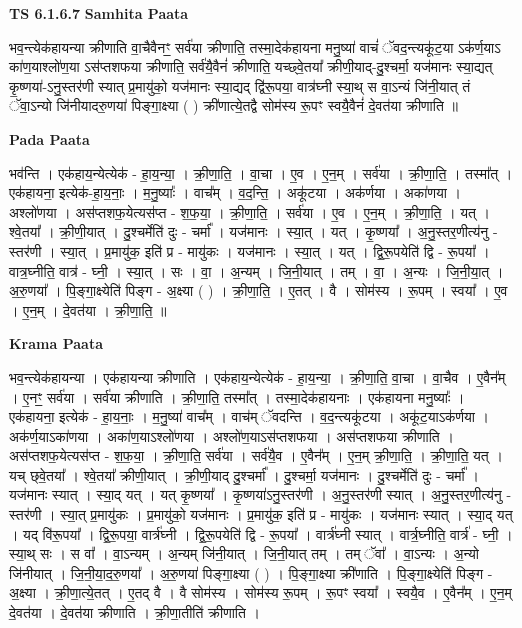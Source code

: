 \documentclass[17pt]{extarticle}
\begin{document}
\textbf{TS 6.1.6.7 } \newline
\textbf{Samhita Paata} \newline

भव॒न्त्येक॑हायन्या क्रीणाति वा॒चैवैनꣳ॒॒ सर्व॑या क्रीणाति॒ तस्मा॒देक॑हायना मनु॒ष्या॑ वाचं॑ ॅवद॒न्त्यकू॑ट॒या ऽक॑र्ण॒याऽ का॑ण॒याश्लो॑ण॒या ऽस॑प्तशफया क्रीणाति॒ सर्व॑यै॒वैनं॑ क्रीणाति॒ यच्छ्वे॒तया᳚ क्रीणी॒याद्-दु॒श्चर्मा॒ यज॑मानः स्या॒द्यत् कृ॒ष्णया॑-ऽनु॒स्तर॑णी स्यात् प्र॒मायु॑को॒ यज॑मानः स्या॒द्यद् द्वि॑रू॒पया॒ वात्र॑घ्नी स्या॒थ् स वा॒ऽन्यं जि॑नी॒यात् तं ॅवा॒ऽन्यो जि॑नीयादरु॒णया॑ पिङ्गा॒क्ष्या ( ) क्री॑णात्ये॒तद्वै सोम॑स्य रू॒पꣳ स्वयै॒वैनं॑ दे॒वत॑या क्रीणाति ॥ \newline

\textbf{Pada Paata} \newline

भव॑न्ति । एक॑हाय॒न्येत्येक॑ - हा॒य॒न्या॒ । क्री॒णा॒ति॒ । वा॒चा । ए॒व । ए॒न॒म् । सर्व॑या । क्री॒णा॒ति॒ । तस्मा᳚त् । एक॑हायना॒ इत्येक॑-हा॒य॒नाः॒ । म॒नु॒ष्याः᳚ । वाच᳚म् । व॒द॒न्ति॒ । अकू॑टया । अक॑र्णया । अका॑णया । अश्लो॑णया । अस॑प्तशफ॒येत्यस॑प्त - श॒फ॒या॒ । क्री॒णा॒ति॒ । सर्व॑या । ए॒व । ए॒न॒म् । क्री॒णा॒ति॒ । यत् । श्वे॒तया᳚ । क्री॒णी॒यात् । दु॒श्चर्मेति॑ दुः - चर्मा᳚ । यज॑मानः । स्या॒त् । यत् । कृ॒ष्णया᳚ । अ॒नु॒स्तर॒णीत्य॑नु - स्तर॑णी । स्या॒त् । प्र॒मायु॑क॒ इति॑ प्र - मायु॑कः । यज॑मानः । स्या॒त् । यत् । द्वि॒रू॒पयेति॑ द्वि - रू॒पया᳚ । वात्र॒घ्नीति॒ वात्र॑ - घ्नी॒ । स्या॒त् । सः । वा॒ । अ॒न्यम् । जि॒नी॒यात् । तम् । वा॒ । अ॒न्यः । जि॒नी॒या॒त् । अ॒रु॒णया᳚ । पि॒ङ्गा॒क्ष्येति॑ पिङ्ग - अ॒क्ष्या ( ) । क्री॒णा॒ति॒ । ए॒तत् । वै । सोम॑स्य । रू॒पम् । स्वया᳚ । ए॒व । ए॒न॒म् । दे॒वत॑या । क्री॒णा॒ति॒ ॥  \newline


\textbf{Krama Paata} \newline

भव॒न्त्येक॑हायन्या । एक॑हायन्या क्रीणाति । एक॑हाय॒न्येत्येक॑ - हा॒य॒न्या॒ । क्री॒णा॒ति॒ वा॒चा । वा॒चैव । ए॒वैन᳚म् । ए॒नꣳ॒॒ सर्व॑या । सर्व॑या क्रीणाति । क्री॒णा॒ति॒ तस्मा᳚त् । तस्मा॒देक॑हायनाः । एक॑हायना मनु॒ष्याः᳚ । एक॑हायना॒ इत्येक॑ - हा॒य॒नाः॒ । म॒नु॒ष्या॑ वाच᳚म् । वाच॑म् ॅवदन्ति । व॒द॒न्त्यकू॑टया । अकू॑ट॒याऽक॑र्णया । अक॑र्ण॒याऽका॑णया । अका॑ण॒याऽश्लो॑णया । अश्लो॑ण॒याऽस॑प्तशफया । अस॑प्तशफया क्रीणाति । अस॑प्तशफ॒येत्यस॑प्त - श॒फ॒या॒ । क्री॒णा॒ति॒ सर्व॑या । सर्व॑यै॒व । ए॒वैन᳚म् । ए॒न॒म् क्री॒णा॒ति॒ । क्री॒णा॒ति॒ यत् । यच् छ्‌वे॒तया᳚ । श्वे॒तया᳚ क्रीणी॒यात् । क्री॒णी॒याद् दु॒श्चर्मा᳚ । दु॒श्चर्मा॒ यज॑मानः । दु॒श्चर्मेति॑ दुः - चर्मा᳚ । यज॑मानः स्यात् । स्या॒द् यत् । यत् कृ॒ष्णया᳚ । कृ॒ष्णया॑ऽनु॒स्तर॑णी । अ॒नु॒स्तर॑णी स्यात् । अ॒नु॒स्तर॒णीत्य॑नु - स्तर॑णी । स्या॒त् प्र॒मायु॑कः । प्र॒मायु॑को॒ यज॑मानः । प्र॒मायु॑क॒ इति॑ प्र - मायु॑कः । यज॑मानः स्यात् । स्या॒द् यत् । यद् वि॑रू॒पया᳚ । द्वि॒रू॒पया॒ वार्त्र॑घ्नी । द्वि॒रू॒पयेति॑ द्वि - रू॒पया᳚ । वार्त्र॑घ्नी स्यात् । वार्त्र॒घ्नीति॒ वार्त्र॑ - घ्नी॒ । स्या॒थ् सः । स वा᳚ । वा॒ऽन्यम् । अ॒न्यम् जि॑नी॒यात् । जि॒नी॒यात् तम् । तम् ॅवा᳚ । वा॒ऽन्यः । अ॒न्यो जि॑नीयात् । जि॒नी॒या॒द॒रु॒णया᳚ । अ॒रु॒णया॑ पिङ्‍गा॒क्ष्या ( ) । पि॒ङ्‍गा॒क्ष्या क्री॑णाति । पि॒ङ्‍गा॒क्ष्येति॑ पिङ्‍ग - अ॒क्ष्या । क्री॒णा॒त्ये॒तत् । ए॒तद् वै । वै सोम॑स्य । सोम॑स्य रू॒पम् । रू॒पꣳ स्वया᳚ । स्वयै॒व । ए॒वैन᳚म् । ए॒न॒म् दे॒वत॑या । दे॒वत॑या क्रीणाति । क्री॒णा॒तीति॑ क्रीणाति । \newline
\end{document}
